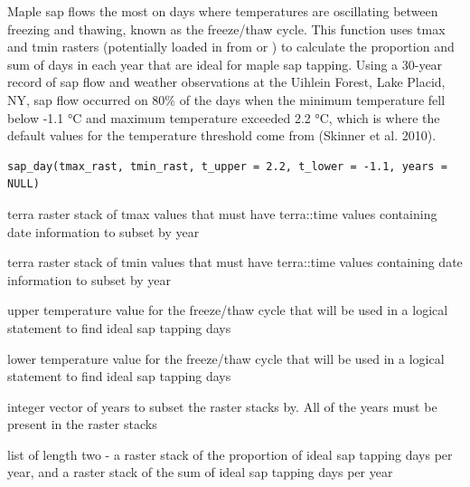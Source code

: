 %
\begin{Description}
Maple sap flows the most on days where temperatures are oscillating between
freezing and thawing, known as the freeze/thaw cycle. This function uses
tmax and tmin rasters (potentially loaded in from  or
) to calculate the proportion and sum of days in each year
that are ideal for maple sap tapping. Using a 30-year record of sap flow
and weather observations at the Uihlein Forest, Lake Placid, NY, sap flow
occurred on 80\% of the days when the minimum temperature fell below
-1.1 °C and maximum temperature exceeded 2.2 °C, which is where the
default values for the temperature threshold come from (Skinner et al.
2010).
\end{Description}
%
\begin{Usage}
\begin{verbatim}
sap_day(tmax_rast, tmin_rast, t_upper = 2.2, t_lower = -1.1, years = NULL)
\end{verbatim}
\end{Usage}
%
\begin{Arguments}
\begin{ldescription}
\item[\code{tmax\_rast}] terra raster stack of tmax values that must have terra::time
values containing date information to subset by year

\item[\code{tmin\_rast}] terra raster stack of tmin values that must have terra::time
values containing date information to subset by year

\item[\code{t\_upper}] upper temperature value for the freeze/thaw cycle that
will be used in a logical statement to find ideal sap tapping days

\item[\code{t\_lower}] lower temperature value for the freeze/thaw cycle that
will be used in a logical statement to find ideal sap tapping days

\item[\code{years}] integer vector of years to subset the raster stacks by. All
of the years must be present in the raster stacks
\end{ldescription}
\end{Arguments}
%
\begin{Value}
list of length two - a raster stack of the proportion of ideal
sap tapping days per year, and a raster stack of the sum of ideal sap
tapping days per year
\end{Value}
